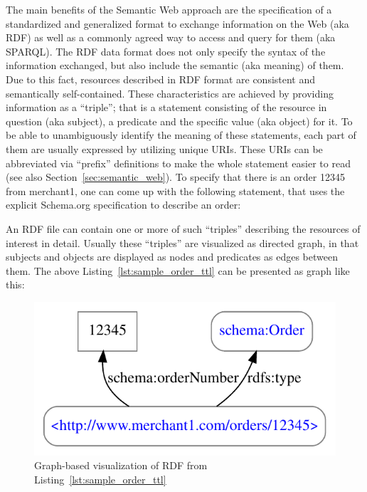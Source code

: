 The main benefits of the Semantic Web approach are the specification of a standardized and generalized format to exchange information on the Web (aka \gls{RDF}) as well as a commonly agreed way to access and query for them (aka \gls{SPARQL}). The \gls{RDF} data format does not only specify the syntax of the information exchanged, but also include the semantic (aka meaning) of them. Due to this fact, resources described in \gls{RDF} format are consistent and semantically self-contained. These characteristics are achieved by providing information as a ``triple''; that is a statement consisting of the resource in question (aka subject), a predicate and the specific value (aka object) for it. To be able to unambiguously identify the meaning of these statements, each part of them are usually expressed by utilizing unique \gls{URI}s. These \gls{URI}s can be abbreviated via ``prefix'' definitions to make the whole statement easier to read (see also Section~\ref{sec:semantic_web}). To specify that there is an order 12345 from merchant1, one can come up with the following statement, that uses the explicit Schema.org specification \citep{Schema.org} to describe an order: \@


An \gls{RDF} file can contain one or more of such ``triples'' describing the resources of interest in detail. Usually these ``triples'' are visualized as directed graph, in that subjects and objects are displayed as nodes and predicates as edges between them. The above Listing~\ref{lst:sample_order_ttl} can be presented as graph like this:\@

\begin{figure}[H]
  \centering
  \includegraphics[width=0.8\columnwidth]{images/sample_order_12345.pdf}
  \caption{Graph-based visualization of \gls{RDF} from Listing~\ref{lst:sample_order_ttl}}
\label{fig:sample_order_graph_image}
\end{figure}

